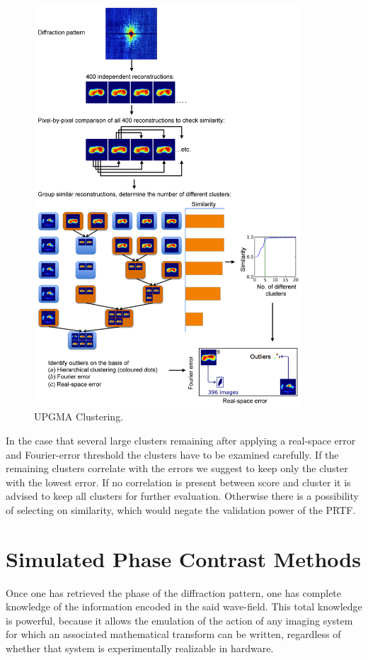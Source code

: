 \begin{figure}[h]
	\centering 
		\includegraphics[width=100mm]{UPGMA_Clustering.jpg}
	\caption{UPGMA Clustering.}
	\label{fig:UPGMA}
\end{figure}

In the case that several large clusters remaining after applying a real-space error and Fourier-error threshold the clusters have to be examined carefully. If the remaining clusters correlate with the errors we suggest to keep only the cluster with the lowest error. If no correlation is present between score and cluster it is advised to keep all clusters for further evaluation. Otherwise there is a possibility of selecting on similarity, which would negate the validation power of the PRTF.

 
\section{Simulated Phase Contrast Methods}
Once one has retrieved the phase of the diffraction pattern, one has complete knowledge of the information encoded in the said wave-field. This total knowledge is powerful, because it allows the emulation of the action of any imaging system for which an associated mathematical transform can be written, regardless of whether that system is experimentally realizable in hardware.

